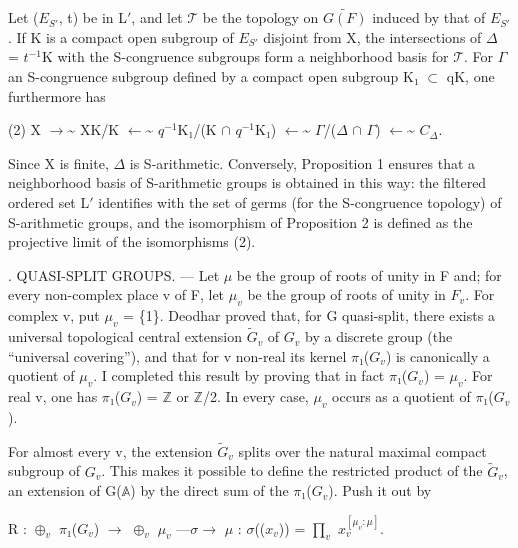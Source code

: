 \documentclass[10pt,a4paper]{article}
\begin{document}
\smallskip
\noindent Let (\ensuremath{E_{S′}}, t) be in L\ensuremath{′}, and let \ensuremath{𝒯} be the topology on \ensuremath{\widetilde{G(F)}} induced by that of \ensuremath{E_{S′}}. If K is a compact open subgroup of \ensuremath{E_{S′}} disjoint from X, the intersections of \ensuremath{Δ} = \ensuremath{t^{-1}}K with the S-congruence subgroups form a neighborhood basis for \ensuremath{𝒯}. For \ensuremath{Γ} an S-congruence subgroup defined by a compact open subgroup K\ensuremath{₁} \ensuremath{⊂} qK, one furthermore has\par
\smallskip
\noindent (2)    X  \ensuremath{→}\textasciitilde{}  XK/K  \ensuremath{←}\textasciitilde{}  \ensuremath{q^{-1}}K\ensuremath{₁}/(K \ensuremath{∩} \ensuremath{q^{-1}}K\ensuremath{₁})  \ensuremath{←}\textasciitilde{}  \ensuremath{Γ}/(\ensuremath{Δ} \ensuremath{∩} \ensuremath{Γ})  \ensuremath{←}\textasciitilde{}  \ensuremath{C_Δ}.\par
\smallskip
\noindent Since X is finite, \ensuremath{Δ} is S-arithmetic. Conversely, Proposition 1 ensures that a neighborhood basis of S-arithmetic groups is obtained in this way: the filtered ordered set L\ensuremath{′} identifies with the set of germs (for the S-congruence topology) of S-arithmetic groups, and the isomorphism of Proposition 2 is defined as the projective limit of the isomorphisms (2).\par
\smallskip
{}. QUASI-SPLIT GROUPS. — Let \ensuremath{μ} be the group of roots of unity in F and; for every non-complex place v of F, let \ensuremath{μ_v} be the group of roots of unity in \ensuremath{F_v}. For complex v, put \ensuremath{μ_v} = \{1\}. Deodhar proved that, for G quasi-split, there exists a universal topological central extension \ensuremath{\widetilde{G}_v} of \ensuremath{G_v} by a discrete group (the “universal covering”), and that for v non-real its kernel \ensuremath{π₁}(\ensuremath{G_v}) is canonically a quotient of \ensuremath{μ_v}. I completed this result by proving that in fact \ensuremath{π₁}(\ensuremath{G_v}) = \ensuremath{μ_v}. For real v, one has \ensuremath{π₁}(\ensuremath{G_v}) = \ensuremath{ℤ} or \ensuremath{ℤ}/2. In every case, \ensuremath{μ_v} occurs as a quotient of \ensuremath{π₁}(\ensuremath{G_v}).\par
\smallskip
\noindent For almost every v, the extension \ensuremath{\widetilde{G}_v} splits over the natural maximal compact subgroup of \ensuremath{G_v}. This makes it possible to define the restricted product of the \ensuremath{\widetilde{G}_v}, an extension of G(\ensuremath{𝔸}) by the direct sum of the \ensuremath{π₁}(\ensuremath{G_v}). Push it out by\par
\smallskip
\noindent R : \ensuremath{⊕_v} \ensuremath{π₁}(\ensuremath{G_v}) \ensuremath{→} \ensuremath{⊕_v} \ensuremath{μ_v} —\ensuremath{σ→} \ensuremath{μ} : \ensuremath{σ}((\ensuremath{x_v})) = \ensuremath{∏_v} \ensuremath{x_v^{[μ_v:μ]}}.\par
\clearpage
{}\hypertarget{authority-page-0004}{}
\end{document}
